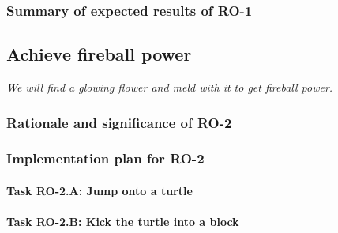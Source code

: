 \vspace{-10pt}
\subsubsection{Summary of expected results of RO-1}
\vspace{-6pt}

\lipsum[1]













\bigskip
\vspace{-10pt}
\subsection{Achieve fireball power}
\label{sec:RO2}
\vspace{-6pt}

\textit{We will find a glowing flower and meld with it to get fireball power.}




\vspace{-10pt}
\subsubsection{Rationale and significance of RO-2}
\vspace{-6pt}

\lipsum[2]

\vspace{-10pt}
\subsubsection{Implementation plan for RO-2} 
\label{sec:RO2plan}

\vspace{-6pt}
\paragraph*{Task RO-2.A: Jump onto a turtle}
\lipsum[1]

\vspace{-6pt}
\paragraph*{Task RO-2.B: Kick the turtle into a block}
\lipsum[1]

